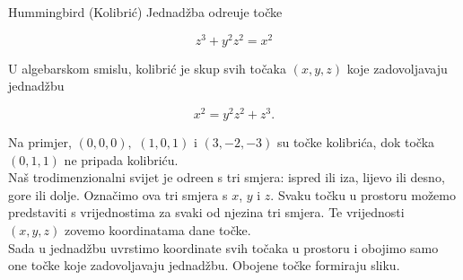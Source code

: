 \begin{surferPage}{Hummingbird (Kolibri\'{c})}
Jednad\v{z}ba odre\dj{}uje to\v{c}ke \\
  
  \smallskip
	
\[z^3+ y^2	z^2	= x^2\]

\singlespacing
U algebarskom smislu, kolibri\'{c} je skup svih to\v{c}aka $(x, y, z)$ koje zadovoljavaju jednad\v{z}bu

\smallskip

\[ x^2= y^2z^2+z^3.\]

\smallskip

Na primjer, $(0,0,0),$ $(1,0,1)$ i $(3,-2,-3)$ su to\v{c}ke kolibri\'{c}a, dok to\v{c}ka $(0,1,1)$ ne pripada 
kolibri\'{c}u.\\
 \singlespacing
Na\v{s} trodimenzionalni svijet je odre\dj{}en s tri smjera: ispred ili iza, lijevo ili desno, gore ili dolje. Ozna\v{c}imo ova tri smjera s $x$, $y$ i $z$. Svaku to\v{c}ku u prostoru mo\v{z}emo predstaviti s vrijednostima za svaki od njezina tri smjera. Te vrijednosti $(x,y,z)$ zovemo koordinatama dane to\v{c}ke.  \\
\singlespacing
Sada u jednad\v{z}bu uvrstimo koordinate svih to\v{c}aka u prostoru i obojimo samo one to\v{c}ke koje zadovoljavaju jednad\v{z}bu. Obojene to\v{c}ke formiraju sliku.
\end{surferPage}

